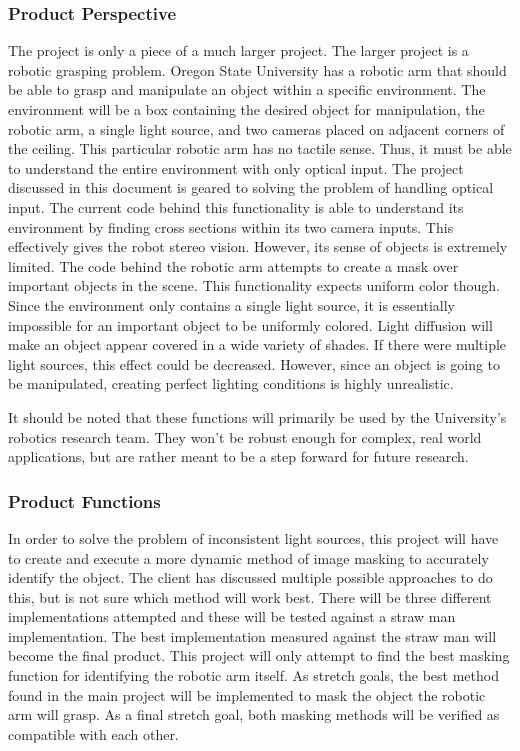 \documentclass[10pt,journal,compsoc, draftclsnofoot,onecolumn]{IEEEtran}
\begin{document}
\subsubsection{Product Perspective}
The project is only a piece of a much larger project.
The larger project is a robotic grasping problem.
Oregon State University has a robotic arm that should be able to grasp and manipulate an object within a specific environment.
The environment will be a box containing the desired object for manipulation, the robotic arm, a single light source, and two cameras placed on adjacent corners of the ceiling.
This particular robotic arm has no tactile sense.
Thus, it must be able to understand the entire environment with only optical input.
The project discussed in this document is geared to solving the problem of handling optical input.
The current code behind this functionality is able to understand its environment by finding cross sections within its two camera inputs.
This effectively gives the robot stereo vision.
However, its sense of objects is extremely limited.
The code behind the robotic arm attempts to create a mask over important objects in the scene.
This functionality expects uniform color though.
Since the environment only contains a single light source, it is essentially impossible for an important object to be uniformly colored.
Light diffusion will make an object appear covered in a wide variety of shades.
If there were multiple light sources, this effect could be decreased.
However, since an object is going to be manipulated, creating perfect lighting conditions is highly unrealistic.

\noindent
It should be noted that these functions will primarily be used by the University's robotics research team.
They won't be robust enough for complex, real world applications, but are rather meant to be a step forward for future research.

\subsubsection{Product Functions}
In order to solve the problem of inconsistent light sources, this project will have to create and execute a more dynamic method of image masking to accurately identify the object.
The client has discussed multiple possible approaches to do this, but is not sure which method will work best.
There will be three different implementations attempted and these will be tested against a straw man implementation.
The best implementation measured against the straw man will become the final product.
This project will only attempt to find the best masking function for identifying the robotic arm itself.
As stretch goals, the best method found in the main project will be implemented to mask the object the robotic arm will grasp.
As a final stretch goal, both masking methods will be verified as compatible with each other.
\end{document}
